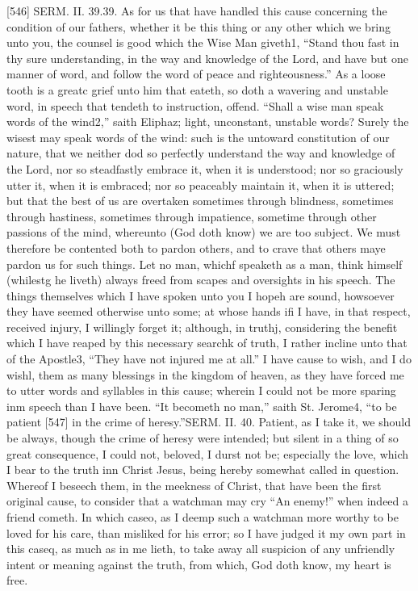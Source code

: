 [546]
SERM. II. 39.39. As for us that have handled this cause concerning the condition of our fathers, whether it be this thing or any other which we bring unto you, the counsel is good which the Wise Man giveth1, “Stand thou fast in thy sure understanding, in the way and knowledge of the Lord, and have but one manner of word, and follow the word of peace and righteousness.” As a loose tooth is a greatc grief unto him that eateth, so doth a wavering and unstable word, in speech that tendeth to instruction, offend. “Shall a wise man speak words of the wind2,” saith Eliphaz; light, unconstant, unstable words? Surely the wisest may speak words of the wind: such is the untoward constitution of our nature, that we neither dod so perfectly understand the way and knowledge of the Lord, nor so steadfastly embrace it, when it is understood; nor so graciously utter it, when it is embraced; nor so peaceably maintain it, when it is uttered; but that the best of us are overtaken sometimes through blindness, sometimes through hastiness, sometimes through impatience, sometime through other passions of the mind, whereunto (God doth know) we are too subject. We must therefore be contented both to pardon others, and to crave that others maye pardon us for such things. Let no man, whichf speaketh as a man, think himself (whilestg he liveth) always freed from scapes and oversights in his speech. The things themselves which I have spoken unto you I hopeh are sound, howsoever they have seemed otherwise unto some; at whose hands ifi I have, in that respect, received injury, I willingly forget it; although, in truthj, considering the benefit which I have reaped by this necessary searchk of truth, I rather incline unto that of the Apostle3, “They have not injured me at all.” I have cause to wish, and I do wishl, them as many blessings in the kingdom of heaven, as they have forced me to utter words and syllables in this cause; wherein I could not be more sparing inm speech than I have been. “It becometh no man,” saith St. Jerome4, “to be patient [547] in the crime of heresy.”SERM. II. 40. Patient, as I take it, we should be always, though the crime of heresy were intended; but silent in a thing of so great consequence, I could not, beloved, I durst not be; especially the love, which I bear to the truth inn Christ Jesus, being hereby somewhat called in question. Whereof I beseech them, in the meekness of Christ, that have been the first original cause, to consider that a watchman may cry “An enemy!” when indeed a friend cometh. In which caseo, as I deemp such a watchman more worthy to be loved for his care, than misliked for his error; so I have judged it my own part in this caseq, as much as in me lieth, to take away all suspicion of any unfriendly intent or meaning against the truth, from which, God doth know, my heart is free.

